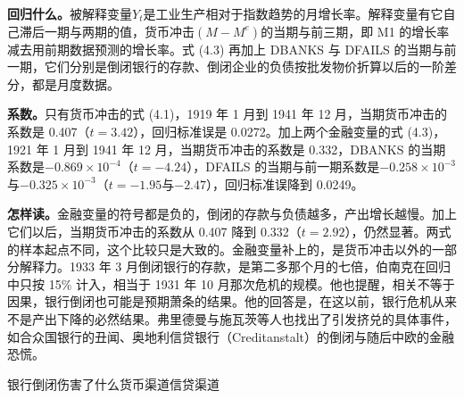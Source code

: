 \begin{deeper}[伯南克的回归]
\textbf{回归什么。}被解释变量$Y_t$是工业生产相对于指数趋势的月增长率。解释变量有它自己滞后一期与两期的值，货币冲击$(M-M^e)$的当期与前三期，即 M1 的增长率减去用前期数据预测的增长率。式 (4.3) 再加上 DBANKS 与 DFAILS 的当期与前一期，它们分别是倒闭银行的存款、倒闭企业的负债按批发物价折算以后的一阶差分，都是月度数据\cite{bernanke1983}。

\textbf{系数。}只有货币冲击的式 (4.1)，1919 年 1 月到 1941 年 12 月，当期货币冲击的系数是 0.407（$t=3.42$），回归标准误是 0.0272\cite{bernanke1983}。加上两个金融变量的式 (4.3)，1921 年 1 月到 1941 年 12 月，当期货币冲击的系数是 0.332，DBANKS 的当期系数是$-0.869\times10^{-4}$（$t=-4.24$），DFAILS 的当期与前一期系数是$-0.258\times10^{-3}$与$-0.325\times10^{-3}$（$t=-1.95$与$-2.47$），回归标准误降到 0.0249\cite{bernanke1983}。

\textbf{怎样读。}金融变量的符号都是负的，倒闭的存款与负债越多，产出增长越慢。加上它们以后，当期货币冲击的系数从 0.407 降到 0.332（$t=2.92$），仍然显著。两式的样本起点不同，这个比较只是大致的。金融变量补上的，是货币冲击以外的一部分解释力。1933 年 3 月倒闭银行的存款，是第二多那个月的七倍，伯南克在回归中只按 15\% 计入，相当于 1931 年 10 月那次危机的规模\cite{bernanke1983}。他也提醒，相关不等于因果，银行倒闭也可能是预期萧条的结果\cite{bernanke1983}。他的回答是，在这以前，银行危机从来不是产出下降的必然结果。弗里德曼与施瓦茨等人也找出了引发挤兑的具体事件，如合众国银行的丑闻、奥地利信贷银行（Creditanstalt）的倒闭与随后中欧的金融恐慌\cite{bernanke1983}。
\end{deeper}

\begin{compare}{银行倒闭伤害了什么}{货币渠道}{信贷渠道}
\end{compare}

